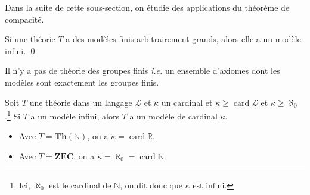 \documentclass[./main]{subfiles}
\begin{document}
  Dans la suite de cette sous-section, on étudie des applications du théorème de compacité.

  \begin{thm}
    Si une théorie $T$ a des modèles finis arbitrairement grands, alors elle a un modèle infini.
    \qed
  \end{thm}

  \begin{crlr}
    Il n'y a pas de théorie des groupes finis \textit{i.e.} un ensemble d'axiomes dont les modèles sont exactement les groupes finis.
  \end{crlr}

  \begin{thm}
    Soit $T$ une théorie dans un langage $\mathcal{L}$ et $\kappa$ un cardinal et $\kappa \ge \operatorname{card} \mathcal{L}$ et $\kappa \ge \aleph_0$.\footnote{Ici, $\aleph_0$ est le cardinal de $\mathds{N}$, on dit donc que $\kappa$ est infini.}
    Si $T$ a un modèle infini, alors $T$ a un modèle de cardinal $\kappa$.
  \end{thm}

  \begin{exm}
    \begin{itemize}
      \item Avec $T = \mathbf{Th}(\mathds{N})$, on a $\kappa = \operatorname{card} \mathds{R}$.
      \item Avec $T = \mathbf{ZFC}$, on a $\kappa = \aleph_0 = \operatorname{card} \mathds{N}$.
    \end{itemize}
  \end{exm}
\end{document}
